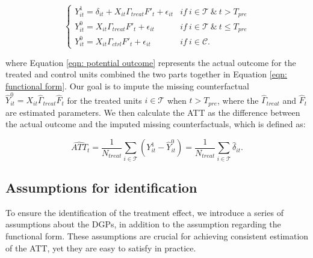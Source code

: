 \documentclass[12pt]{article}
\begin{document}
\begin{equation}
\label{eqn: potential outcome}
\begin{cases}
      Y_{it}^1 = \delta_{it} + X_{it} \Gamma_{treat} F'_t + \epsilon_{it} & if \ i \in \mathcal{T} \ \& \ t > T_{pre} \\
      Y_{it}^0 = X_{it} \Gamma_{treat} F'_t + \epsilon_{it} & if \ i \in \mathcal{T} \ \& \ t \leq T_{pre} \\
      Y_{it}^0 = X_{it} \Gamma_{ctrl} F'_t + \epsilon_{it} & if \ i \in \mathcal{C}.
\end{cases}
\end{equation}

where Equation \ref{eqn: potential outcome} represents the actual outcome for the treated and control units combined the two parts together in Equation \ref{eqn: functional form}. Our goal is to impute the missing counterfactual $\hat{Y}_{it}^0 = X_{it} \hat{\Gamma}_{treat} \hat{F}_t$ for the treated units $i \in \mathcal{T}$ when $t > T_{pre}$, where the $\hat{\Gamma}_{treat}$ and $\hat{F}_t$ are estimated parameters. We then calculate the ATT as the difference between the actual outcome and the imputed missing counterfactuals, which is defined as:

\begin{equation}
\widehat{ATT}_{t} = \frac{1}{N_{treat}}\sum_{i \in \mathcal{T}} \left( Y_{it}^1 - \hat{Y}_{it}^0 \right) = \frac{1}{N_{treat}}\sum_{i \in \mathcal{T}}\hat{\delta}_{it}.
\end{equation}

\subsection{Assumptions for identification} 
\label{sec: assumptions}
To ensure the identification of the treatment effect, we introduce a series of assumptions about the DGPs, in addition to the assumption regarding the functional form. These assumptions are crucial for achieving consistent estimation of the ATT, yet they are easy to satisfy in practice.
\end{document}
